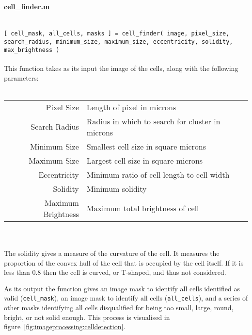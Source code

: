 \documentclass[../main.tex]{subfiles}
\begin{document}
\paragraph{cell\_finder.m}\ \\
\texttt{[ cell\_mask, all\_cells, masks ] = cell\_finder( image, pixel\_size, search\_radius, minimum\_size, maximum\_size, eccentricity, solidity, max\_brightness ) }
\\\\
This function takes as its input the image of the cells, along with the following parameters:
\\\\
\begin{tabular}{rl}
Pixel Size		&	Length of pixel in microns\\
Search Radius 	&	Radius in which to search for cluster in microns\\
Minimum Size		&	Smallest cell size in square microns\\
Maximum Size		&	Largest cell size in square microns\\
Eccentricity		&	Minimum ratio of cell length to cell width\\
Solidity			&	Minimum solidity\\
Maximum Brightness	&	Maximum total brightness of cell
\end{tabular}
\\\\
The solidity gives a measure of the curvature of the cell. It measures the proportion of the convex hull of the cell that is occupied by the cell itself. If it is less than 0.8 then the cell is curved, or T-shaped, and thus not considered.

As its output the function gives an image mask to identify all cells identified as valid (\texttt{cell\_mask}), an image mask to identify all cells (\texttt{all\_cells}), and a series of other masks identifying all cells disqualified for being too small, large, round, bright, or not solid enough. This process is visualised in figure~\ref{fig:imageprocessing:celldetection}.
\end{document}
